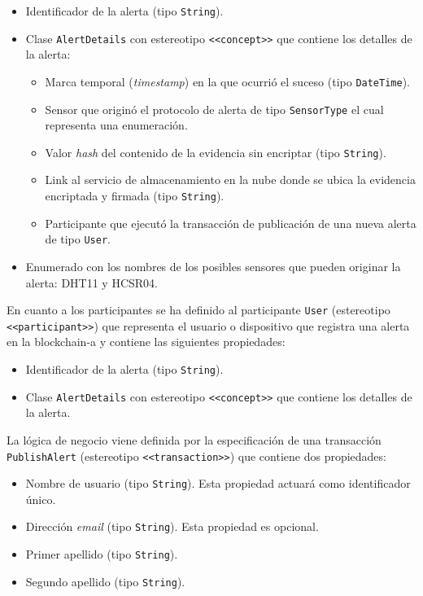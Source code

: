 \documentclass[12pt,a4paper, twoside]{report}
\begin{document}
		\begin{itemize}
			\item Identificador de la alerta (tipo \texttt{String}).
			\item Clase \texttt{AlertDetails} con estereotipo \texttt{<<concept>>} que contiene los detalles de la alerta:
			
			\begin{itemize}
				\item Marca temporal (\textit{timestamp}) en la que ocurrió el suceso (tipo \texttt{DateTime}).
				\item Sensor que originó el protocolo de alerta de tipo \texttt{SensorType} el cual representa una enumeración.
				\item Valor \textit{hash} del contenido de la evidencia sin encriptar (tipo \texttt{String}).
				\item Link al servicio de almacenamiento en la nube donde se ubica la evidencia encriptada y firmada (tipo \texttt{String}).
				\item Participante que ejecutó la transacción de publicación de una nueva alerta de tipo \texttt{User}.
			\end{itemize}
			
			\item Enumerado con los nombres de los posibles sensores que pueden originar la alerta: DHT11 y HCSR04.
		\end{itemize}
		
	En cuanto a los participantes se ha definido al participante \texttt{User} (estereotipo \texttt{<<participant>>}) que representa el usuario o dispositivo que registra una alerta en la \gls{blockchain-a} y contiene las siguientes propiedades: 	
		
		\begin{itemize}
			\item Identificador de la alerta (tipo \texttt{String}).
			\item Clase \texttt{AlertDetails} con estereotipo \texttt{<<concept>>} que contiene los detalles de la alerta.
		\end{itemize}
		
	La lógica de negocio viene definida por la especificación de una transacción \texttt{PublishAlert} (estereotipo \texttt{<<transaction>>}) que contiene dos propiedades:
	
		\begin{itemize}
			\item Nombre de usuario (tipo \texttt{String}). Esta propiedad actuará como identificador único.
			\item Dirección \textit{email} (tipo \texttt{String}). Esta propiedad es opcional.
			\item Primer apellido (tipo \texttt{String}).
			\item Segundo apellido (tipo \texttt{String}).
		\end{itemize}
	
\end{document}
